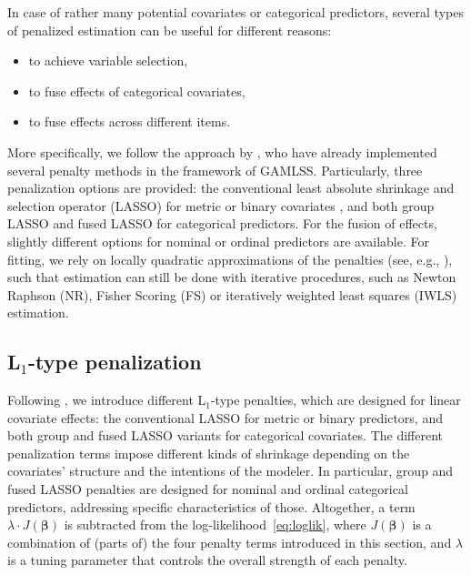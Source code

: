 \documentclass[submit]{smj}
\begin{document}
In case of rather many potential covariates or categorical predictors, several types of  penalized estimation can be useful for different reasons:
\begin{itemize}
\item to achieve variable selection,
    \item to fuse effects of categorical covariates,
    \item to fuse effects across different items.
\end{itemize}
More specifically, we follow the approach by \cite{GroHaKneUm:2019}, who have already implemented several penalty methods in the framework of GAMLSS. Particularly, three penalization options are provided:
the conventional least absolute shrinkage and selection operator (LASSO) for metric or binary
covariates \citep{Tibshirani:96}, and both group LASSO \citep{MeiGeeBue:2008} and fused LASSO \citep{GerTut:2010} for categorical predictors. For the fusion of effects, slightly different options for nominal or ordinal predictors are available.
For fitting, we rely on locally quadratic approximations of the penalties (see, e.g., \citealp{OelTutz:2017}), such that estimation can still be done with iterative procedures, such as Newton Raphson (NR), Fisher Scoring (FS) or iteratively weighted least squares (IWLS) estimation.

\subsection*{L$_{1}$-type penalization} \label{sec:L1pen}

Following \cite{GroHaKneUm:2019}, we introduce different L$_{1}$-type penalties, which are designed for linear covariate effects: the conventional LASSO for metric or binary predictors, and both group and fused LASSO variants for categorical covariates.
The different penalization terms impose different kinds of shrinkage depending on the covariates' structure and the intentions of the modeler.
In particular, group and fused LASSO penalties are designed for nominal and ordinal categorical predictors, addressing specific characteristics of those.
Altogether, a term $\lambda\cdot J(\boldsymbol{\beta})$ is subtracted from the log-likelihood~\eqref{eq:loglik}, where $J(\boldsymbol{\beta})$ is a combination of (parts of) the four penalty terms introduced in this section, and $\lambda$ is a tuning parameter that controls the overall strength of each penalty.
\end{document}
